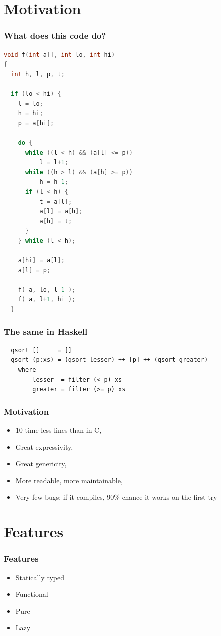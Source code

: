 \documentclass{beamer}
\begin{document}
\section{Motivation}

\begin{frame}[fragile]
\frametitle{What does this code do?}

\begin{lstlisting}[language=C, basicstyle=\tiny]
void f(int a[], int lo, int hi)
{
  int h, l, p, t;

  if (lo < hi) {
    l = lo;
    h = hi;
    p = a[hi];

    do {
      while ((l < h) && (a[l] <= p))
          l = l+1;
      while ((h > l) && (a[h] >= p))
          h = h-1;
      if (l < h) {
          t = a[l];
          a[l] = a[h];
          a[h] = t;
      }
    } while (l < h);

    a[hi] = a[l];
    a[l] = p;

    f( a, lo, l-1 );
    f( a, l+1, hi );
  }
\end{lstlisting}

\end{frame}

\begin{frame}[fragile]
\frametitle{The same in Haskell}

\begin{lstlisting}
  qsort []     = []
  qsort (p:xs) = (qsort lesser) ++ [p] ++ (qsort greater)
    where
        lesser  = filter (< p) xs
        greater = filter (>= p) xs

\end{lstlisting}

\end{frame}

\begin{frame}
\frametitle{Motivation}

 \begin{itemize}
  \item 10 time less lines than in C,
  \item Great expressivity,
  \item Great genericity,
  \item More readable, more maintainable,
  \item Very few bugs: if it compiles, 90\% chance it works on the first try
 \end{itemize}

\end{frame}


\section{Features}
\begin{frame}
\frametitle{Features}

 \begin{itemize}
  \item Statically typed
  \item Functional
  \item Pure
  \item Lazy
 \end{itemize}

\end{frame}
\end{document}
